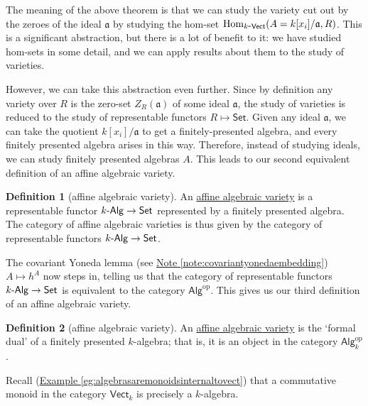 \documentclass[a4paper,10pt]{scrreprt}
\newcommand{\defn}[1]{\ul{#1}}
\newcommand{\Hom}{\mathrm{Hom}}
\def\mhyp{{\hbox{-}}}
\theoremstyle{definition}
\newtheorem{definition}{Definition}[section]
\theoremstyle{plain}
\theoremstyle{remark}
\begin{document}
The meaning of the above theorem is that we can study the variety cut out by the zeroes of the ideal $\mathfrak{a}$ by studying the hom-set $\Hom_{k\mhyp\mathsf{Vect}}(A = k[x_{i}]/\mathfrak{a}, R)$. This is a significant abstraction, but there is a lot of benefit to it: we have studied hom-sets in some detail, and we can apply results about them to the study of varieties.

However, we can take this abstraction even further. Since by definition any variety over $R$ is the zero-set $Z_{R}(\mathfrak{a})$ of some ideal $\mathfrak{a}$, the study of varieties is reduced to the study of representable functors $R \mapsto \mathsf{Set}$. Given any ideal $\mathfrak{a}$, we can take the quotient $k[x_{i}]/\mathfrak{a}$ to get a finitely-presented algebra, and every finitely presented algebra arises in this way. Therefore, instead of studying ideals, we can study finitely presented algebras $A$. This leads to our second equivalent definition of an affine algebraic variety.

\begin{definition}[affine algebraic variety]
  \label{def:affinealgebraicvariety2}
  An \defn{affine algebraic variety} is a representable functor $k\mhyp\mathsf{Alg} \to \mathsf{Set}$ represented by a finitely presented algebra. The category of affine algebraic varieties is thus given by the category of representable functors $k\mhyp\mathsf{Alg} \to \mathsf{Set}$.
\end{definition}

The covariant Yoneda lemma (see \hyperref[note:covariantyonedaembedding]{Note \ref*{note:covariantyonedaembedding}}) $A \mapsto h^{A}$ now steps in, telling us that the category of representable functors $k\mhyp\mathsf{Alg} \to \mathsf{Set}$ is equivalent to the category $\mathsf{Alg}^{\mathrm{op}}$. This gives us our third definition of an affine algebraic variety.

\begin{definition}[affine algebraic variety]
  \label{def:affinealgebraicvariety3}
  An \defn{affine algebraic variety} is the `formal dual' of a finitely presented $k$-algebra; that is, it is an object in the category $\mathsf{Alg}_{k}^{\mathrm{op}}$.
\end{definition}

Recall (\hyperref[eg:algebrasaremonoidsinternaltovect]{Example \ref*{eg:algebrasaremonoidsinternaltovect}}) that a commutative monoid in the category $\mathsf{Vect}_{k}$ is precisely a $k$-algebra.
\end{document}
